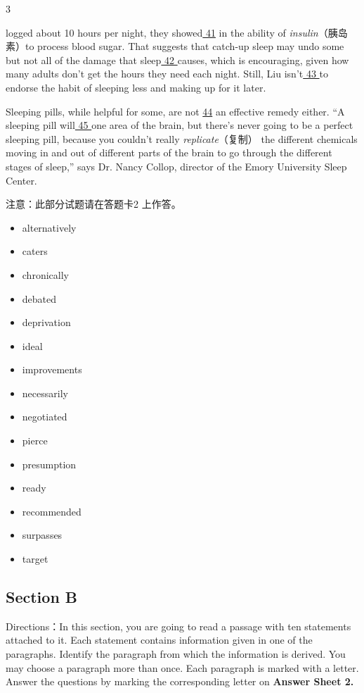 \documentclass[UTF8,11pt]{ctexart}
\begin{document}
3


logged about 10 hours per night, they showed\uline{ 41} in the ability of\textit{ insulin}（胰岛素）to process blood sugar. That suggests that catch-up sleep may undo some but not all of the damage that sleep\uline{ 42 }causes, which is encouraging, given how many adults don’t get the hours they need each night. Still, Liu isn’t\uline{ 43 }to endorse the habit of sleeping less and making up for it later.


Sleeping pills, while helpful for some, are not \uline{44} an effective remedy either. “A sleeping pill will\uline{ 45 }one area of the brain, but there’s never going to be a perfect sleeping pill, because you couldn’t really\textit{ replicate}（复制） the different chemicals moving in and out of different parts of the brain to go through the different stages of sleep,” says Dr. Nancy Collop, director of the Emory University Sleep Center.


注意：此部分试题请在答题卡2 上作答。


\begin{itemize}[leftmargin=2em,itemsep=.2em,topsep=.4em]\item[A.] alternatively
\item[B.] caters
\item[C.] chronically
\item[D.] debated
\item[E.] deprivation
\item[F.] ideal
\item[G.] improvements
\item[H.] necessarily
\item[I.] negotiated
\item[J.] pierce
\item[K.] presumption
\item[L.] ready
\item[M.] recommended
\item[N.] surpasses
\item[O.] target
\end{itemize}

\subsection*{\textbf{Section B}}


Directions：In this section, you are going to read a passage with ten statements attached to it. Each statement contains information given in one of the paragraphs. Identify the paragraph from which the information is derived. You may choose a paragraph more than once. Each paragraph is marked with a letter. Answer the questions by marking the corresponding letter on\textbf{ Answer Sheet 2.}
\end{document}
